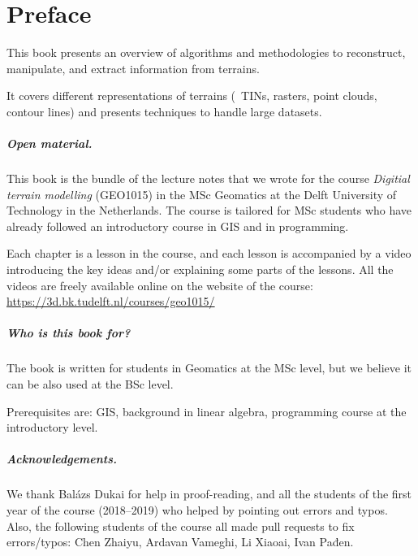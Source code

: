 


\chapter*{Preface}

This book presents an overview of algorithms and methodologies to reconstruct, manipulate, and extract information from terrains.

It covers different representations of terrains (\eg\ TINs, rasters, point clouds, contour lines) and presents techniques to handle large datasets.



\paragraph*{Open material.}
This book is the bundle of the lecture notes that we wrote for the course \emph{Digitial terrain modelling} (GEO1015) in the MSc Geomatics at the Delft University of Technology in the Netherlands.
The course is tailored for MSc students who have already followed an introductory course in GIS and in programming.

Each chapter is a lesson in the course, and each lesson is accompanied by a video introducing the key ideas and/or explaining some parts of the lessons.
All the videos are freely available online on the website of the course: \url{https://3d.bk.tudelft.nl/courses/geo1015/}


\paragraph*{Who is this book for?}
The book is written for students in Geomatics at the MSc level, but we believe it can be also used at the BSc level.

Prerequisites are: GIS, background in linear algebra, programming course at the introductory level.


\paragraph*{Acknowledgements.}
We thank Balázs Dukai for help in proof-reading, and all the students of the first year of the course (2018--2019) who helped by pointing out errors and typos.
Also, the following students of the course all made pull requests to fix errors/typos: Chen Zhaiyu, Ardavan Vameghi, Li Xiaoai, Ivan Pađen.






